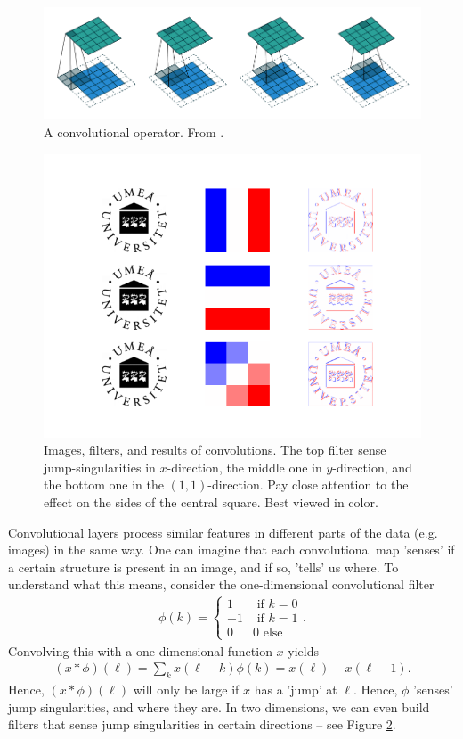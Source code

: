 \documentclass{article}
\begin{document}
\begin{figure}
    \centering
    \includegraphics{graphics/convolutional_layer.png}
    \caption{A convolutional operator. From \cite{dumoulin2016guide}.}
    \label{fig:enter-label}
\end{figure}

\begin{figure}
    \centering
    \includegraphics[width=0.75\linewidth]{graphics/filter_fig.png}

    \caption{\label{fig:filter}Images, filters, and results of convolutions. The top filter sense jump-singularities in $x$-direction, the middle one in $y$-direction, and the bottom one in the $(1,1)$-direction. Pay close attention to the effect on the sides of the central square. Best viewed in color.}
\end{figure}

Convolutional layers process similar features in different parts of the data (e.g. images) in the same way. One can imagine that each convolutional map 'senses' if a certain structure is present in an image, and if so, 'tells' us where. To understand what this means, consider the one-dimensional convolutional filter
\begin{align*}
    \phi(k) = \begin{cases}
        1 & \text{ if } k = 0 \\
        -1 & \text{ if } k= 1 \\
        0 & 0 \text{ else}
    \end{cases}.
\end{align*}
Convolving this with a one-dimensional function $x$ yields
\begin{align*}
    (x*\phi)(\ell) = \sum_{k}x(\ell-k)\phi(k) = x(\ell)-x(\ell-1).
\end{align*}
Hence, $(x*\phi)(\ell)$ will only be large if $x$ has a 'jump'  at $\ell$. Hence, $\phi$ 'senses' jump singularities, and where they are. In two dimensions, we can even build filters that sense jump singularities in certain directions -- see Figure \ref{fig:filter}.
\end{document}

